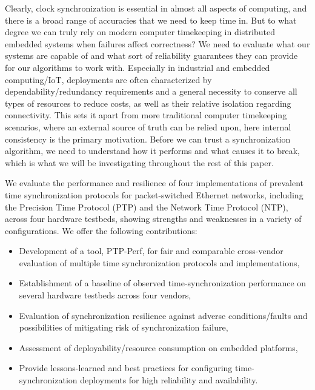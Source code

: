 Clearly, clock synchronization is essential in almost all aspects of computing, and there is a broad range of accuracies that we need to keep time in. But to what degree we can truly rely on modern computer timekeeping in distributed embedded systems when failures affect correctness?
We need to evaluate what our systems are capable of and what sort of reliability guarantees they can provide for our algorithms to work with.
Especially in industrial and embedded computing/IoT, deployments are often characterized by dependability/redundancy requirements and a general necessity to conserve all types of resources to reduce costs, as well as their relative isolation regarding connectivity.
This sets it apart from more traditional computer timekeeping scenarios, where an external source of truth can be relied upon, here internal consistency is the primary motivation.
Before we can trust a synchronization algorithm, we need to understand how it performs and what causes it to break, which is what we will be investigating throughout the rest of this paper.


We evaluate the performance and resilience of four implementations of prevalent time synchronization protocols for packet-switched Ethernet networks, including the Precision Time Protocol (PTP) and the Network Time Protocol (NTP), across four hardware testbeds, showing strengths and weaknesses in a variety of configurations. We offer the following contributions:

\begin{itemize}
    \item Development of a tool, PTP-Perf, for fair and comparable cross-vendor evaluation of multiple time synchronization protocols and implementations,
    \item Establishment of a baseline of observed time-synchronization performance on several hardware testbeds across four vendors,
    \item Evaluation of synchronization resilience against adverse conditions/faults and possibilities of mitigating risk of synchronization failure,
    \item Assessment of deployability/resource consumption on embedded platforms,
    \item Provide lessons-learned and best practices for configuring time-synchronization deployments for high reliability and availability.
\end{itemize}

